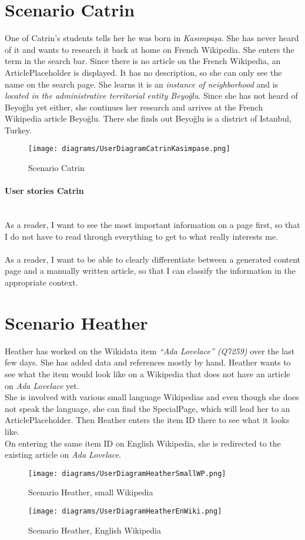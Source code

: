 \section{Scenario Catrin}
One of Catrin's students tells her he was born in \textit{Kasımpaşa}. She has never heard of it and wants to research it back at home on French Wikipedia. She enters the term in the search bar. Since there is no article on the French Wikipedia, an ArticlePlaceholder is displayed. It has no description, so she can only see the name on the search page. She learns it is an \textit{instance of neighborhood} and is \textit{located in the administrative territorial entity Beyoğlu}. Since she has not heard of Beyoğlu yet either, she continues her research and arrives at the French Wikipedia article Beyoğlu. There she finds out Beyoğlu is a district of Istanbul, Turkey.
\begin{figure}[H]
	\centering
	\texttt{[image: diagrams/UserDiagramCatrinKasimpase.png]}
	\caption{Scenario Catrin}
	\label{fig:ScenarioCartin}
\end{figure}

\paragraph{User stories Catrin} ~\\
As a reader, I want to see the most important information on a page first, so that I do not have to read through everything to get to what really interests me. \\
\\
As a reader, I want to be able to clearly differentiate between a generated content page and a manually written article, so that I can classify the information in the appropriate context.

\section{Scenario Heather}
Heather has worked on the Wikidata item \textit{``Ada Lovelace'' (Q7259)} over the last few days. She has added data and references mostly by hand. Heather wants to see what the item would look like on a Wikipedia that does not have an article on \textit{Ada Lovelace} yet. \\
She is involved with various small language Wikipedias and even though she does not speak the language, she can find the SpecialPage, which will lead her to an ArticlePlaceholder. Then Heather enters the item ID there to see what it looks like. \\
On entering the same item ID on English Wikipedia, she is redirected to the existing article on \textit{Ada Lovelace}.
\begin{figure}[H]
	\centering
	\texttt{[image: diagrams/UserDiagramHeatherSmallWP.png]}
	\caption{Scenario Heather, small Wikipedia}
	\label{fig:ScenarioHeatherSmall}
\end{figure}
\begin{figure}[H]
	\centering
	\texttt{[image: diagrams/UserDiagramHeatherEnWiki.png]}
	\caption{Scenario Heather, English Wikipedia}
	\label{fig:ScenarioHeatherEnWiki}
\end{figure}

